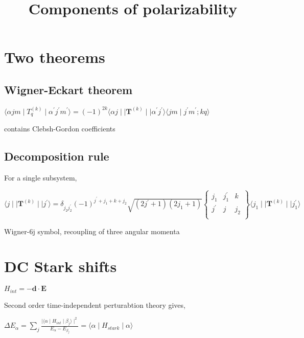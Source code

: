 \documentclass{article}
\title{Components of polarizability}
\begin{document}
    
    
    \maketitle
    
    

    
    \section{Two theorems}\label{two-theorems}

    \subsection{Wigner-Eckart theorem}\label{wigner-eckart-theorem}

    $\langle \alpha j m \mid  T_q^{(k)} \mid \alpha^{'} j^{'} m^{'} \rangle = (-1)^{2k} \langle \alpha j  \mid \mid \textbf{T}^{(k)} \mid \mid \alpha^{'} j^{'}  \rangle \langle jm \mid j^{'} m^{'}; k q \rangle$

contains Clebsh-Gordon coefficients

    \subsection{Decomposition rule}\label{decomposition-rule}

    For a single subsystem,

$\langle  j  \mid \mid \textbf{T}^{(k)} \mid \mid j^{'}  \rangle = \delta_{j_2 j_2^{'}} (-1)^{j^{'} + j_1 + k + j_{2}} \sqrt{(2j^{'} + 1)(2 j_1 + 1)}  \begin{Bmatrix} j_{1} & j_{1}^{'} & k \\ j^{'} & j  & j_{2} \\ \end{Bmatrix} \langle  j_1  \mid \mid \textbf{T}^{(k)} \mid \mid j_1^{'}  \rangle$

Wigner-6j symbol, recoupling of three angular momenta

    \section{DC Stark shifts}\label{dc-stark-shifts}

    $H_{int} = - \textbf{d} \cdot \textbf{E}$

Second order time-independent perturabtion theory gives,

$\Delta E_{\alpha} = \sum_j \frac{\mid \langle \alpha \mid H_{int} \mid \beta_j \rangle \mid^2}{E_{\alpha} - E_{\beta_j}} = \langle \alpha \mid H_{stark} \mid \alpha \rangle$
\end{document}
